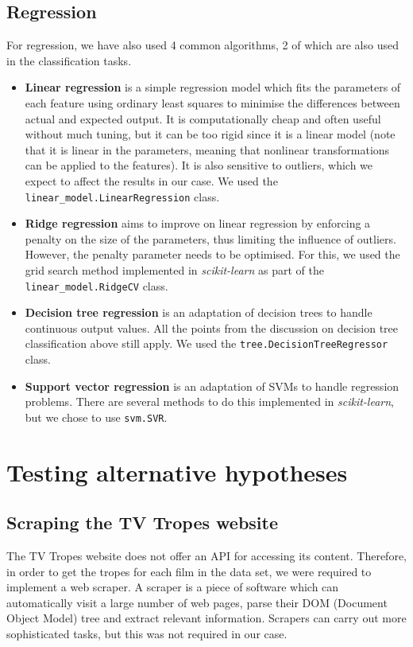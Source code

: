 \documentclass[bsc,frontabs,deptreport,singlespacing,parskip, twoside]{infthesis}
\begin{document}
\subsection{Regression}
For regression, we have also used 4 common algorithms, 2 of which are also used in the classification tasks.
\begin{itemize}
	\item \textbf{Linear regression} is a simple regression model which fits the parameters of each feature using ordinary least squares to minimise the differences between actual and expected output. It is computationally cheap and often useful without much tuning, but it can be too rigid since it is a linear model (note that it is linear in the parameters, meaning that nonlinear transformations can be applied to the features). It is also sensitive to outliers, which we expect to affect the results in our case. We used the \texttt{linear\_model.LinearRegression} class.
	\item \textbf{Ridge regression} aims to improve on linear regression by enforcing a penalty on the size of the parameters, thus limiting the influence of outliers. However, the penalty parameter needs to be optimised. For this, we used the grid search method implemented in \textit{scikit-learn} as part of the \texttt{linear\_model.RidgeCV} class.
	\item \textbf{Decision tree regression} \cite{breiman1984classification} is an adaptation of decision trees to handle continuous output values. All the points from the discussion on decision tree classification above still apply. We used the \texttt{tree.DecisionTreeRegressor} class.
	\item \textbf{Support vector regression} is an adaptation of SVMs to handle regression problems. There are several methods to do this implemented in \textit{scikit-learn}, but we chose to use \texttt{svm.SVR}.
\end{itemize}

\section{Testing alternative hypotheses}
\label{sec:alt_hyp_implementation}

\subsection{Scraping the TV Tropes website}
The TV Tropes website does not offer an API for accessing its content. Therefore, in order to get the tropes for each film in the data set, we were required to implement a web scraper. A scraper is a piece of software which can automatically visit a large number of web pages, parse their DOM (Document Object Model) tree and extract relevant information. Scrapers can carry out more sophisticated tasks, but this was not required in our case.
\end{document}
